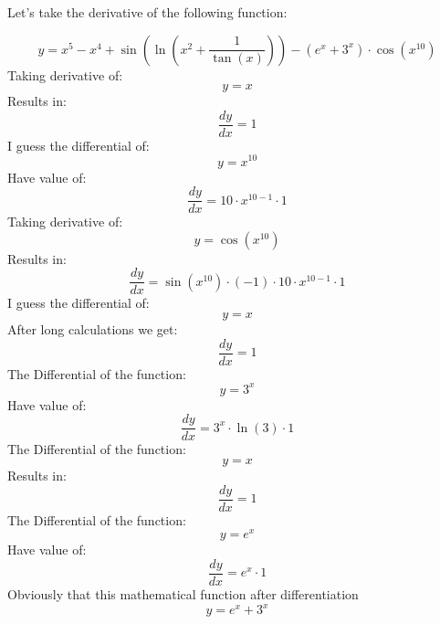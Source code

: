 \documentclass{article}
\begin{document}
\begin{center}
{\Large Let's take the derivative of the following function:}

\begin{dmath}
 y = x^{5}-x^{4}+\sin (\ln (x^{2}+\dfrac{1}{\tan (x)}))-(e^{x}+3^{x})\cdot \cos (x^{10})
\end{dmath}
Taking derivative of:
\begin{dmath}
 y = x
\end{dmath}
Results in:
\begin{dmath}
 \frac{dy}{dx} = 1
\end{dmath}
I guess the differential of:
\begin{dmath}
 y = x^{10}
\end{dmath}
Have value of:
\begin{dmath}
 \frac{dy}{dx} = 10\cdot x^{10-1}\cdot 1
\end{dmath}
Taking derivative of:
\begin{dmath}
 y = \cos (x^{10})
\end{dmath}
Results in:
\begin{dmath}
 \frac{dy}{dx} = \sin (x^{10})\cdot (-1)\cdot 10\cdot x^{10-1}\cdot 1
\end{dmath}
I guess the differential of:
\begin{dmath}
 y = x
\end{dmath}
After long calculations we get:
\begin{dmath}
 \frac{dy}{dx} = 1
\end{dmath}
The Differential of the function:
\begin{dmath}
 y = 3^{x}
\end{dmath}
Have value of:
\begin{dmath}
 \frac{dy}{dx} = 3^{x}\cdot \ln (3)\cdot 1
\end{dmath}
The Differential of the function:
\begin{dmath}
 y = x
\end{dmath}
Results in:
\begin{dmath}
 \frac{dy}{dx} = 1
\end{dmath}
The Differential of the function:
\begin{dmath}
 y = e^{x}
\end{dmath}
Have value of:
\begin{dmath}
 \frac{dy}{dx} = e^{x}\cdot 1
\end{dmath}
Obviously that this mathematical function after differentiation
\begin{dmath}
 y = e^{x}+3^{x}

\end{dmath}
\end{center}
\end{document}
